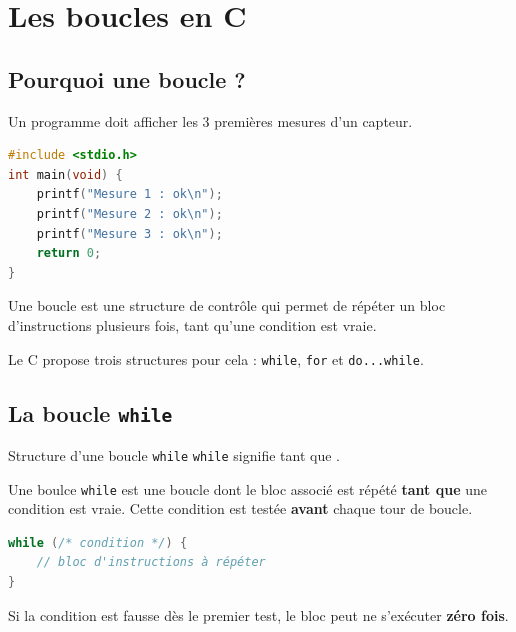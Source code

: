 


\section{Les boucles en C}


\subsection{Pourquoi une boucle ?}

Un programme doit afficher les 3 premières mesures d'un capteur.

\begin{lstlisting}[language=c,caption={affichage de 3 mesures},label=codeC1]
#include <stdio.h>
int main(void) {
    printf("Mesure 1 : ok\n");
    printf("Mesure 2 : ok\n");
    printf("Mesure 3 : ok\n");
    return 0;
}
\end{lstlisting}

\TrouPourquoiUneBoucle

Une boucle est une structure de contrôle qui permet de répéter un bloc d'instructions plusieurs fois, tant qu'une condition est vraie.

Le C propose trois structures pour cela : \texttt{while}, \texttt{for} et \texttt{do...while}.

\subsection{La boucle \texttt{while}}

\begin{UPSTIinfor}{Structure d'une boucle \texttt{while} }
  \texttt{while} signifie \og tant que \fg{}.

  Une boulce \texttt{while} est une boucle dont le bloc associé est répété \textbf{tant que} une condition est vraie. Cette condition est testée \textbf{avant} chaque tour de boucle.
  \begin{lstlisting}[language=c,caption={Structure d'une boucle \texttt{while}},label=codeWhile]
while (/* condition */) {
    // bloc d'instructions à répéter
}
  \end{lstlisting}
  Si la condition est fausse dès le premier test, le bloc peut ne s'exécuter \textbf{zéro fois}.
\end{UPSTIinfor}

